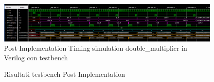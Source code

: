 \documentclass[]{IEEEtran}
\begin{document}
\begin{figure}[bt]
    \centering
    \includegraphics[width=\textwidth]{figures/sim_tb_tim}
    \caption{Post-Implementation Timing simulation double\_multiplier in Verilog con testbench}
    \label{fig:SIM_TB_TIM}
\end{figure}
\begin{figure}
    \centering
    \caption{Risultati testbench Post-Implementation}
    \label{fig:SIM_TB_TIM_RES}
\end{figure}
\end{document}
